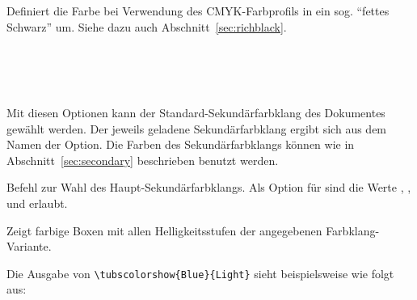 Definiert die Farbe  bei Verwendung des CMYK-Farbprofils
in ein sog. "`fettes Schwarz"' um. Siehe dazu auch Abschnitt~\ref{sec:richblack}.

\begin{Declaration}
  \\
  \\
  \\
\end{Declaration}

Mit diesen Optionen kann der Standard-Sekundärfarbklang des Dokumentes gewählt
werden. Der jeweils geladene Sekundärfarbklang ergibt sich aus dem Namen
der Option.
Die Farben des Sekundärfarbklangs können wie in Abschnitt~\ref{sec:secondary}
beschrieben benutzt werden.

\begin{Declaration}
\end{Declaration}

Befehl zur Wahl des Haupt-Sekundärfarbklangs. Als Option für 
sind die Werte , ,  und 
erlaubt.

\begin{Declaration}
\end{Declaration}

Zeigt farbige Boxen mit allen Helligkeitsstufen der angegebenen Farbklang-Variante.
\begin{example}
 Die Ausgabe von \lstinline!\tubscolorshow{Blue}{Light}! sieht beispielsweise
 wie folgt aus:\\
 \hspace*{-1cm}
\end{example}

\fussy
